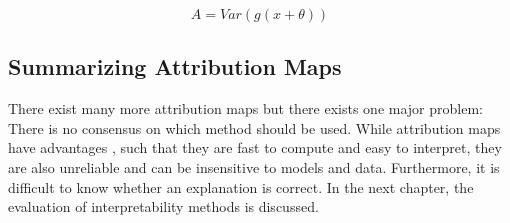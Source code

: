 $$ A = Var(g(x+\theta))$$


%
%
%
%



\subsection{Summarizing Attribution Maps}

There exist many more attribution maps but there exists one major problem: There is no consensus on which method should be used. While attribution maps have advantages \cite{molnar2022}, such that they are fast to compute and easy to interpret, they are also unreliable and can be insensitive to models and data. Furthermore, it is difficult to know whether an explanation is correct. In the next chapter, the evaluation of interpretability methods is discussed.

